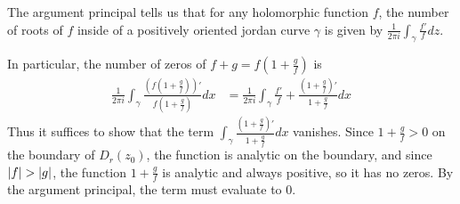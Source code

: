 \documentclass{homework}
\begin{document}
                                                                                                                                                     \begin{solution}
                                                                                                                                                     The argument principal tells us that for any holomorphic function $f$, the number of roots of $f$ inside of a positively oriented jordan curve $\gamma$ is given by
                                                                                                                                                      $\frac{1}{2\pi i}\int_\gamma \frac{f'}{f} dz.$

                                                                                                                                                      In particular, the number of zeros of $f+g = f(1 + \frac{g}{f})$ is
                                                                                                                                                      \begin{align*}
                                                                                                                                                      \frac{1}{2\pi i}\int_\gamma \frac{(f(1 + \frac{g}{f}))'}{f(1 + \frac{g}{f})}dx &=
                                                                                                                                                      \frac{1}{2\pi i}\int_\gamma \frac{f'}{f} + \frac{(1+\frac{g}{f})'}{1 + \frac{g}{f}}dx 
                                                                                                                                                      \end{align*}
                                                                                                                                                      Thus it suffices to show that the term 
                                                                                                                                                      \(
                                                                                                                                                      \int_\gamma \frac{(1+\frac{g}{f})'}{1 + \frac{g}{f}}dx
                                                                                                                                                      \)
                                                                                                                                                      vanishes. Since $1+\frac{g}{f}>0$ on the boundary of $D_r(z_0)$, the function is analytic on the boundary, and since $\abs{f}>\abs{g}$, the function $1+\frac{g}{f}$ is analytic and always positive, so it has no zeros. By the argument principal, the term must evaluate to 0.
                                                                                                                                                      \end{solution}
\end{document}
